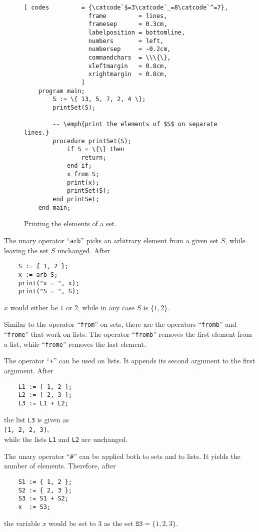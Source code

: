 \begin{figure}[!ht]
  \centering
\begin{Verbatim}[ codes         = {\catcode`$=3\catcode`_=8\catcode`^=7},
                  frame         = lines, 
                  framesep      = 0.3cm, 
                  labelposition = bottomline,
                  numbers       = left,
                  numbersep     = -0.2cm,
                  commandchars  = \\\{\},
                  xleftmargin   = 0.8cm,
                  xrightmargin  = 0.8cm,
                ]
    program main;
        S := \{ 13, 5, 7, 2, 4 \};
        printSet(S);
        
        -- \emph{print the elements of $S$ on separate lines.}
        procedure printSet(S);
            if S = \{\} then
                return;
            end if;
            x from S;
            print(x);
            printSet(S);
        end printSet;
    end main;
\end{Verbatim} 
\vspace*{-0.3cm}
\caption{Printing the elements of a set.}  \label{fig:from.stl}
\end{figure} %

The unary operator ``\texttt{arb}'' picks an arbitrary element from a given set $S$, while
leaving the set $S$ unchanged.
After 
\begin{verbatim}
    S := { 1, 2 };
    x := arb S;
    print("x = ", x);
    print("S = ", S);
\end{verbatim}
$x$ would either be  $1$ or $2$, while in any case $S$ is $\{ 1, 2 \}$.

Similar to the operator ``\texttt{from}'' on sets, there are the operators
``\texttt{fromb}'' and ``\texttt{frome}'' that work on lists.  The operator
``\texttt{fromb}'' removes the first element from a list, while ``\texttt{frome}''
removes the last element.

The operator ``\texttt{+}'' can be used on lists. It appends its second argument to the
first argument. After
\begin{verbatim}
    L1 := [ 1, 2 ];
    L2 := [ 2, 3 ];
    L3 := L1 + L2;
\end{verbatim}
the list \texttt{L3} is given as
\\[0.2cm]
\hspace*{1.3cm}
\texttt{[1, 2, 2, 3]},
\\[0.2cm]
while the lists \texttt{L1} and \texttt{L2} are unchanged.

The unary  operator ``\texttt{\#}'' can be applied both to sets and to lists.
It yields the number of elements.  Therefore, after
\begin{verbatim}
    S1 := { 1, 2 };
    S2 := { 2, 3 };
    S3 := S1 + S2;
    x  := S3;
\end{verbatim}
the variable $x$ would be set to 3 as the set $\mathtt{S3} = \{ 1, 2, 3 \}$.

